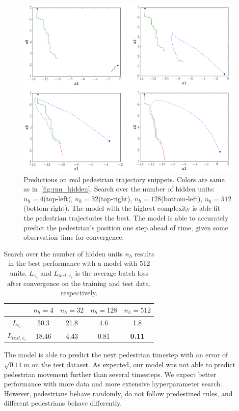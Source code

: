 \begin{figure}
	\centering
	\includegraphics [trim=0 0 0 0, clip, angle=0, width=1.0\columnwidth,
	keepaspectratio]{figures/rnn_real_ped}
	\caption{Predictions on real pedestrian trajectory snippets. Colors are same as in~\cref{fig:rnn_hidden}. Search over the number of hidden units: $n_h=4$(top-left), $n_h=32$(top-right), $n_h=128$(bottom-left), $n_h=512$(bottom-right). The model with the highest complexity is able fit the pedestrian trajectories the best. The model is able to accurately predict the pedestrian's position one step ahead of time, given some observation time for convergence.}
	\label{fig:rnn_real_ped}
\end{figure}

\begin{table}[]
\centering
\begin{tabular}{ c| c| c| c| c}
& $n_h=4$ & $n_h=32$ &$n_h=128$ & $n_h=512$\\
\hline
$L_{e_c}$		&  50.3	& 21.8	& 4.6 & 1.8 	\\
$L_{test, e_c}$	& 18.46	& 4.43	& 0.81	& \textbf{0.11} 	\\     
\end{tabular}
\caption{Search over the number of hidden units $n_h$ results in the best performance with a model with 512 units. $L_{e_c}$ and $L_{test, e_c}$ is the average batch loss after convergence on the training and test data, respectively.}
\end{table}\label{tab:rnn_real_ped}

The model is able to predict the next pedestrian timestep with an error of $\sqrt{0.11}m$ on the test dataset.
As expected, our model was not able to predict pedestrian movement further than several timesteps. We expect better performance with more data and more extensive hyperparameter search.
However, pedestrians behave randomly, do not follow predestined rules, and different pedestrians behave differently.